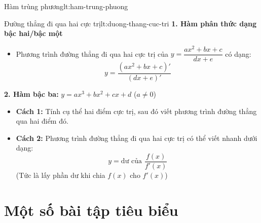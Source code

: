 \begin{lythuyetbox}{Hàm trùng phương}{lt:ham-trung-phuong}
\begin{center}
\end{center}

\end{lythuyetbox}

\begin{lythuyetbox}{Đường thẳng đi qua hai cực trị}{lt:duong-thang-cuc-tri}
\textbf{1. Hàm phân thức dạng bậc hai/bậc một}

\begin{itemize}
    \item Phương trình đường thẳng đi qua hai cực trị của $y = \dfrac{ax^2+bx+c}{dx+e}$ có dạng:
    \[
        y = \frac{(ax^2+bx+c)'}{(dx+e)'}
    \]
\end{itemize}

\textbf{2. Hàm bậc ba:} $y = ax^3 + bx^2 + cx + d$ ($a \neq 0$)

\begin{itemize}
    \item \textbf{Cách 1:} Tính cụ thể hai điểm cực trị, sau đó viết phương trình đường thẳng qua hai điểm đó.
    \item \textbf{Cách 2:} Phương trình đường thẳng đi qua hai cực trị có thể viết nhanh dưới dạng:
    \[
        y = \text{dư của } \frac{f(x)}{f'(x)}
    \]
    (Tức là lấy phần dư khi chia $f(x)$ cho $f'(x)$)
\end{itemize}
\end{lythuyetbox}

\section{Một số bài tập tiêu biểu}

